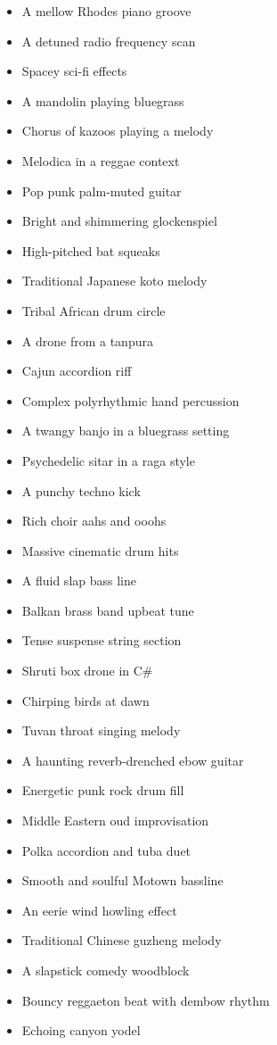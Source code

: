 \documentclass[
  a4paper,  %
  twoside,  %
  bibliography=totoc,
  headsepline,
  cleardoublepage=empty,
  parskip=half,
  draft=false
]{scrbook}
\begin{document}
\begin{multicols}{4}
\begin{itemize}
    \item A mellow Rhodes piano groove
    \item A detuned radio frequency scan
    \item Spacey sci-fi effects
    \item A mandolin playing bluegrass
    \item Chorus of kazoos playing a melody
    \item Melodica in a reggae context
    \item Pop punk palm-muted guitar
    \item Bright and shimmering glockenspiel
    \item High-pitched bat squeaks
    \item Traditional Japanese koto melody
    \item Tribal African drum circle
    \item A drone from a tanpura
    \item Cajun accordion riff
    \item Complex polyrhythmic hand percussion
    \item A twangy banjo in a bluegrass setting
    \item Psychedelic sitar in a raga style
    \item A punchy techno kick
    \item Rich choir aahs and ooohs
    \item Massive cinematic drum hits
    \item A fluid slap bass line
    \item Balkan brass band upbeat tune
    \item Tense suspense string section
    \item Shruti box drone in C\#
    \item Chirping birds at dawn
    \item Tuvan throat singing melody
    \item A haunting reverb-drenched ebow guitar
    \item Energetic punk rock drum fill
    \item Middle Eastern oud improvisation
    \item Polka accordion and tuba duet
    \item Smooth and soulful Motown bassline
    \item An eerie wind howling effect
    \item Traditional Chinese guzheng melody
    \item A slapstick comedy woodblock
    \item Bouncy reggaeton beat with dembow rhythm
    \item Echoing canyon yodel
\end{itemize}
\end{multicols}
\end{document}
